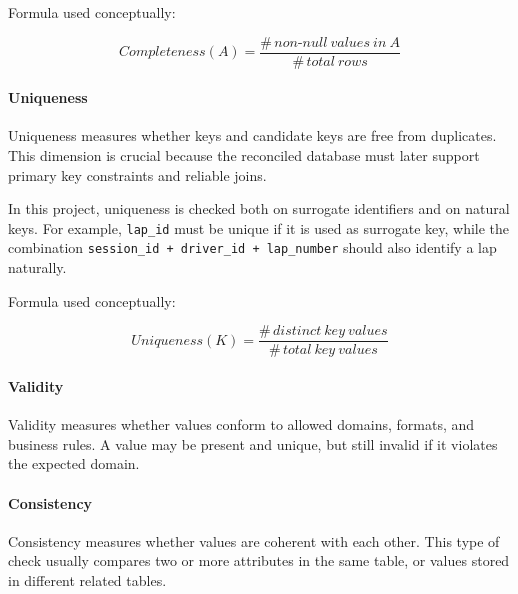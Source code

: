 \documentclass[a4paper,11pt]{article}
\begin{document}
	\vspace{2em}
	Formula used conceptually:
	
	\[
	Completeness(A) = \frac{\#\,non\mbox{-}null\ values\ in\ A}{\#\,total\ rows}
	\]
	
	\paragraph{Uniqueness}
	
	Uniqueness measures whether keys and candidate keys are free from duplicates.
	This dimension is crucial because the reconciled database must later support primary key constraints and reliable joins.
	
	In this project, uniqueness is checked both on surrogate identifiers and on natural keys.
	For example, \texttt{lap\_id} must be unique if it is used as surrogate key, while the combination \texttt{session\_id + driver\_id + lap\_number} should also identify a lap naturally.
	
	\vspace{2em}
	Formula used conceptually:
	
	\[
	Uniqueness(K) = \frac{\#\,distinct\ key\ values}{\#\,total\ key\ values}
	\]
	
	\paragraph{Validity}
	
	Validity measures whether values conform to allowed domains, formats, and business rules.
	A value may be present and unique, but still invalid if it violates the expected domain.
	

	
	\paragraph{Consistency}
	
	Consistency measures whether values are coherent with each other.
	This type of check usually compares two or more attributes in the same table, or values stored in different related tables.
	
\end{document}
